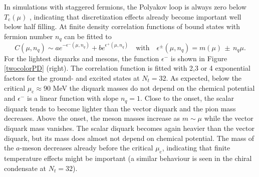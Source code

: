 \documentclass{PoS}
\begin{document}
   In simulations with staggered fermions, the Polyakov loop is always zero below $T_\text{c}(\mu)$ \cite{Holicki:2017psk}, indicating that discretization effects already become important well below half filling.
   At finite density correlation functions of bound states with fermion number $n_q$ can be fitted to
   \begin{equation}
    C(\mu,n_q) \sim a e^{-\epsilon^-(\mu,n_q)}+b e^{\epsilon^+(\mu,n_q)} \quad \text{with} \quad \epsilon^\pm(\mu,n_q)=m(\mu)\,\pm\, n_q \mu .
   \end{equation}
   For the lightest diquarks and mesons, the function $\epsilon^-$ is shown in Figure \ref{twocolorPD} (right).
   The correlation function is fitted with 2,3 or 4 exponential factors for the ground- and excited states at $N_t=32$.
   As expected, below the critical $\mu_\text{c}\approx 90$ MeV the diquark masses do not depend on the chemical potential and $\epsilon^-$ is a linear function with slope $n_q=1$. Close to the onset, the scalar diquark tends to become lighter
   than the vector diquark and the pion mass decreases. Above the onset, the meson masses increase as $m\sim \mu$ while the vector diquark mass vanishes. The scalar diquark becomes again heavier than the vector diquark, but its mass does almost not depend on chemical potential.
   The mass of the $a$-meson decreases already before the critical $\mu_\text{c}$, indicating that finite temperature effects might be important (a similar behaviour is seen in the chiral condensate at $N_t=32$).
\end{document}
